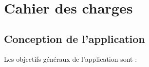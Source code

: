 \chapter{Cahier des charges}

\section{Conception de l'application}

\noindent Les objectifs généraux de l'application sont :
\begin{itemize}

\end{itemize}


